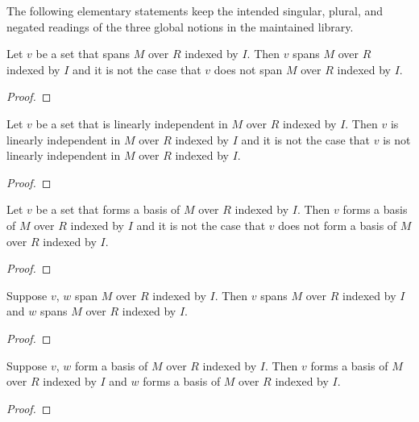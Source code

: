 The following elementary statements keep the intended singular, plural, and
negated readings of the three global notions in the maintained library.

\begin{proposition}\label{indexed_module_spanning_phrase_fixture}
    Let $v$ be a set that spans $M$ over $R$ indexed by $I$.
    Then $v$ spans $M$ over $R$ indexed by $I$ and it is not the case that
        $v$ does not span $M$ over $R$ indexed by $I$.
\end{proposition}
\begin{proof}
\end{proof}

\begin{proposition}\label{indexed_module_linear_independence_phrase_fixture}
    Let $v$ be a set that is linearly independent in $M$ over $R$
        indexed by $I$.
    Then $v$ is linearly independent in $M$ over $R$ indexed by $I$ and
        it is not the case that
            $v$ is not linearly independent in $M$ over $R$ indexed by $I$.
\end{proposition}
\begin{proof}
\end{proof}

\begin{proposition}\label{indexed_module_basis_phrase_fixture}
    Let $v$ be a set that forms a basis of $M$ over $R$ indexed by $I$.
    Then $v$ forms a basis of $M$ over $R$ indexed by $I$ and
        it is not the case that
            $v$ does not form a basis of $M$ over $R$ indexed by $I$.
\end{proposition}
\begin{proof}
\end{proof}

\begin{proposition}\label{indexed_module_spanning_plural_phrase_fixture}
    Suppose $v$, $w$ span $M$ over $R$ indexed by $I$.
    Then $v$ spans $M$ over $R$ indexed by $I$ and
        $w$ spans $M$ over $R$ indexed by $I$.
\end{proposition}
\begin{proof}
\end{proof}

\begin{proposition}\label{indexed_module_basis_plural_phrase_fixture}
    Suppose $v$, $w$ form a basis of $M$ over $R$ indexed by $I$.
    Then $v$ forms a basis of $M$ over $R$ indexed by $I$ and
        $w$ forms a basis of $M$ over $R$ indexed by $I$.
\end{proposition}
\begin{proof}
\end{proof}
